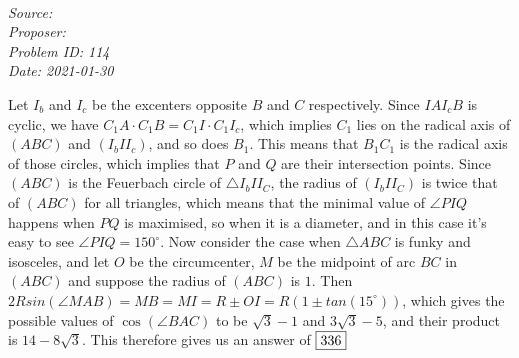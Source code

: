 \SSbreak\\
\emph{Source: \Cop}\\
\emph{Proposer: \Pmatt}\\
\emph{Problem ID: 114}\\
\emph{Date: 2021-01-30}\\
\SSbreak

\bigskip

\begin{solution}\hfil\medskip

Let $I_b$ and $I_c$ be the excenters opposite $B$ and $C$ respectively. Since $IAI_cB$ is cyclic, we have $C_1A \cdot C_1B=C_1I \cdot C_1I_c$, which implies $C_1$ lies on the radical axis of $(ABC)$ and $(I_bII_c)$, and so does $B_1$. This means that $B_1C_1$ is the radical axis of those circles, which implies that $P$ and $Q$ are their intersection points. Since $(ABC)$ is the Feuerbach circle of $\triangle I_bII_C$, the radius of $(I_bII_C)$ is twice that of $(ABC)$ for all triangles, which means that the minimal value of $\angle PIQ$ happens when $PQ$ is maximised, so when it is a diameter, and in this case it's easy to see $\angle PIQ=150^{\circ}$. Now consider the case when $\triangle ABC$ is funky and isosceles, and let $O$ be the circumcenter, $M$ be the midpoint of arc $BC$ in $(ABC)$ and suppose the radius of $(ABC)$ is $1$. Then $2Rsin(\angle MAB)=MB=MI=R\pm OI=R(1\pm tan(15^{\circ}))$, which gives the possible values of $\cos\left(\angle BAC\right)$ to be $\sqrt{3}-1$ and $3\sqrt{3}-5$, and their product is $14-8\sqrt{3}$. This therefore gives us an answer of \(\fbox{336}\)
\end{solution}\bigskip

